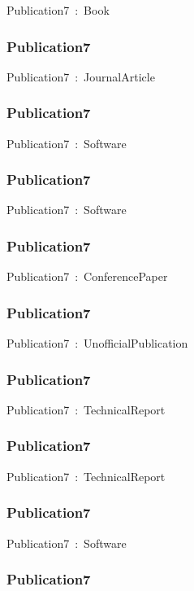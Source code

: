 \documentclass{article}
\begin{document}
Publication7~:~Book

\subsubsection*{Publication7}

Publication7~:~JournalArticle

\subsubsection*{Publication7}

Publication7~:~Software

\subsubsection*{Publication7}

Publication7~:~Software

\subsubsection*{Publication7}

Publication7~:~ConferencePaper

\subsubsection*{Publication7}

Publication7~:~UnofficialPublication

\subsubsection*{Publication7}

Publication7~:~TechnicalReport

\subsubsection*{Publication7}

Publication7~:~TechnicalReport

\subsubsection*{Publication7}

Publication7~:~Software

\subsubsection*{Publication7}
\end{document}
